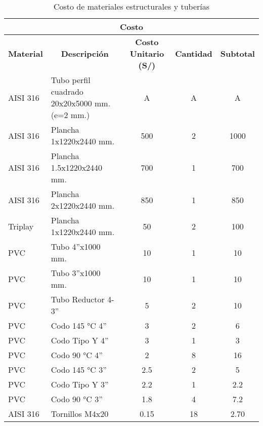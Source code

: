 \begin{table}[H]
	\footnotesize\centering
	\caption{Costo de materiales estructurales y tuberías}
	\label{tab:costo de materiales estructurales y tuberias}
	\begin{tabular}{llc|c|c|}
		\hline
		\multicolumn{5}{|c|}{\textbf{Costo}} \\ \hline
		\multicolumn{1}{|c|}{\textbf{Material}} & \multicolumn{1}{c|}{\textbf{Descripción}} & \multicolumn{1}{c|}{\textbf{Costo Unitario (S/)}} & \multicolumn{1}{c|}{\textbf{Cantidad}} & \multicolumn{1}{c|}{\textbf{Subtotal}} \\ \hline
		\multicolumn{1}{|l|}{AISI 316} & \multicolumn{1}{l|}{Tubo perfil cuadrado 20x20x5000 mm. (e=2 mm.)} & A & A & A \\ \hline
		\multicolumn{1}{|l|}{AISI 316} & \multicolumn{1}{l|}{Plancha 1x1220x2440 mm.} & 500 & 2 & 1000 \\ \hline
		\multicolumn{1}{|l|}{AISI 316} & \multicolumn{1}{l|}{Plancha 1.5x1220x2440 mm.} & 700 & 1 & 700 \\ \hline
		\multicolumn{1}{|l|}{AISI 316} & \multicolumn{1}{l|}{Plancha 2x1220x2440 mm.} & 850 & 1 & 850 \\ \hline		
		\multicolumn{1}{|l|}{Triplay} & \multicolumn{1}{l|}{Plancha 1x1220x2440 mm.} & 50 & 2 & 100 \\ \hline
		\multicolumn{1}{|l|}{PVC} & \multicolumn{1}{l|}{Tubo 4''x1000 mm.} & 10 & 1 & 10 \\ \hline
		\multicolumn{1}{|l|}{PVC} & \multicolumn{1}{l|}{Tubo 3''x1000 mm.} & 10 & 1 & 10 \\ \hline
		\multicolumn{1}{|l|}{PVC} & \multicolumn{1}{l|}{Tubo Reductor 4-3''} & 5 & 2 & 10 \\ \hline
		\multicolumn{1}{|l|}{PVC} & \multicolumn{1}{l|}{Codo 145 °C 4''} & 3 & 2 & 6 \\ \hline
		\multicolumn{1}{|l|}{PVC} & \multicolumn{1}{l|}{Codo Tipo Y 4''} & 3 & 1 & 3 \\ \hline
		\multicolumn{1}{|l|}{PVC} & \multicolumn{1}{l|}{Codo 90 °C 4''} & 2 & 8 & 16 \\ \hline
		\multicolumn{1}{|l|}{PVC} & \multicolumn{1}{l|}{Codo 145 °C 3''} & 2.5 & 2 & 5 \\ \hline
		\multicolumn{1}{|l|}{PVC} & \multicolumn{1}{l|}{Codo Tipo Y 3''} & 2.2 & 1 & 2.2 \\ \hline
		\multicolumn{1}{|l|}{PVC} & \multicolumn{1}{l|}{Codo 90 °C 3''} & 1.8 & 4 & 7.2 \\ \hline
		\multicolumn{1}{|l|}{AISI 316} & \multicolumn{1}{l|}{Tornillos M4x20} & 0.15 & 18 & 2.70 \\ \hline

\end{tabular}
\end{table}
